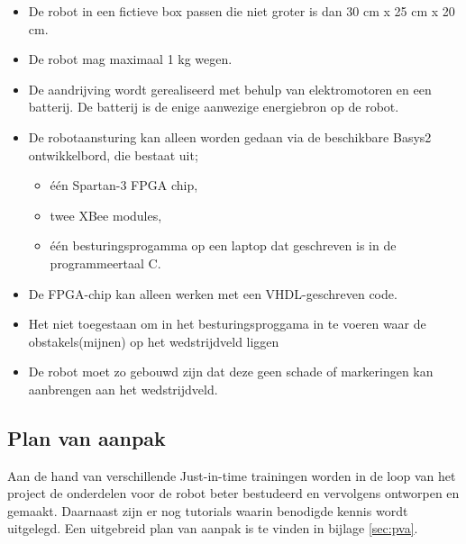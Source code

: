 \documentclass{report}
\begin{document}
\begin{itemize}

\item
De robot in een fictieve box passen die niet groter is dan 30 cm x 25 cm x 20 cm.

\item
De robot mag maximaal 1 kg wegen.

\item
De aandrijving wordt gerealiseerd met behulp van elektromotoren en een batterij. De batterij is de enige aanwezige energiebron op de robot.

\item
De robotaansturing kan alleen worden gedaan via de beschikbare Basys2 ontwikkelbord, die bestaat uit;

\begin{itemize}

\item
één Spartan-3 FPGA chip,

\item
twee XBee modules,

\item
één besturingsprogamma op een laptop dat geschreven is in de programmeertaal C. 

\end{itemize}

\item
De FPGA-chip kan alleen werken met een VHDL-geschreven code.

\item
Het niet toegestaan om in het besturingsproggama in te voeren waar de obstakels(mijnen) op het wedstrijdveld liggen 

\item
De robot  moet zo gebouwd zijn dat deze geen schade of markeringen kan aanbrengen aan het wedstrijdveld.

\end{itemize}

\subsection{Plan van aanpak}

Aan de hand van verschillende Just-in-time trainingen worden in de loop van het project de onderdelen voor de robot beter bestudeerd en vervolgens ontworpen en gemaakt. Daarnaast zijn er nog tutorials waarin benodigde kennis wordt uitgelegd. Een uitgebreid plan van aanpak is te vinden in bijlage \ref{sec:pva}.
\end{document}

